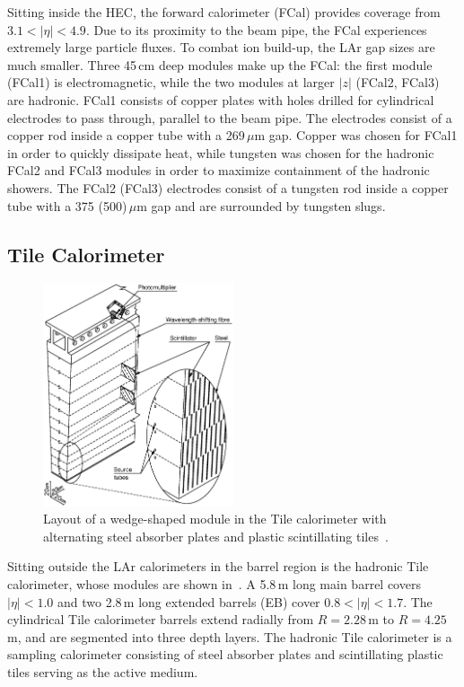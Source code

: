 Sitting inside the HEC, the forward calorimeter (FCal) provides coverage from $3.1<|\eta|<4.9$. Due to its proximity to the beam pipe, the FCal experiences extremely large particle fluxes. To combat ion build-up, the LAr gap sizes are much smaller. Three 45\,cm deep modules make up the FCal: the first module (FCal1) is electromagnetic, while the two modules at larger $|z|$ (FCal2, FCal3) are hadronic. 
FCal1 consists of copper plates with holes drilled for cylindrical electrodes to pass through, parallel to the beam pipe. The electrodes consist of a copper rod inside a copper tube with a 269\,$\mu$m gap. Copper was chosen for FCal1 in order to quickly dissipate heat, while tungsten was chosen for the hadronic FCal2 and FCal3 modules in order to maximize containment of the hadronic showers. The FCal2 (FCal3) electrodes consist of a tungsten rod inside a copper tube with a 375 (500)\,$\mu$m gap and are surrounded by tungsten slugs. 

%
\subsection{Tile Calorimeter}
\begin{figure}
\begin{center}
\includegraphics[width=0.5\textwidth]{figures/ATLAS/TileCal_Module}
\caption[Tile calorimeter module]{Layout of a wedge-shaped module in the Tile calorimeter with alternating steel absorber plates and plastic scintillating tiles~\cite{ATLAS}.}
\label{fig:tilecal}
\end{center}
\end{figure}
Sitting outside the LAr calorimeters in the barrel region is the hadronic Tile calorimeter, whose modules are shown in~\Fig{\ref{fig:tilecal}}. A 5.8\,m long main barrel covers $|\eta|<1.0$ and two 2.8\,m long extended barrels (EB) cover $0.8<|\eta|<1.7$. The cylindrical Tile calorimeter barrels extend radially from $R=2.28$\,m to $R=4.25$\,m, and are segmented into three depth layers. The hadronic Tile calorimeter is a sampling calorimeter consisting of steel absorber plates and scintillating plastic tiles serving as the active medium.

